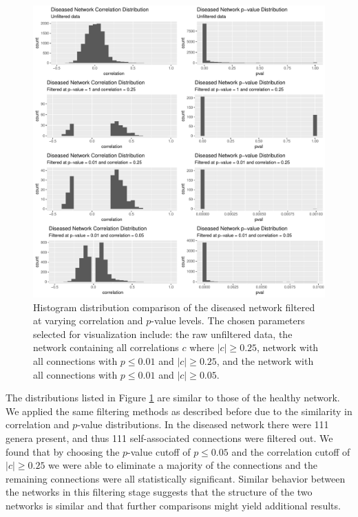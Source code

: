 \begin{figure}[!htb]
    \centering
    \includegraphics[width=1.0\linewidth]{figure/results/diseased_distributions_corr_pval_dist.pdf}
    \caption[Histogram distribution comparison of the diseased network filtered at varying correlation and $p$-value levels.]{Histogram distribution comparison of the diseased network filtered at varying correlation and $p$-value levels. The chosen parameters selected for visualization include: the raw unfiltered data, the network containing all correlations $c$ where $|c| \geq 0.25$, network with all connections with $p \leq 0.01$ and $|c| \geq 0.25$, and the network with all connections with $p \leq 0.01$ and $|c| \geq 0.05$.}
    \label{fig-res-d-dist}
\end{figure}
The distributions listed in Figure \ref{fig-res-d-dist} are similar to those of the healthy network. We applied the same filtering methods as described before due to the similarity in correlation and $p$-value distributions. In the diseased network there were 111 genera present, and thus 111 self-associated connections were filtered out. We found that by choosing the $p$-value cutoff of $p \leq 0.05$ and the correlation cutoff of $|c| \geq 0.25$ we were able to eliminate a majority of the connections and the remaining connections were all statistically significant. Similar behavior between the networks in this filtering stage suggests that the structure of the two networks is similar and that further comparisons might yield additional results. 

